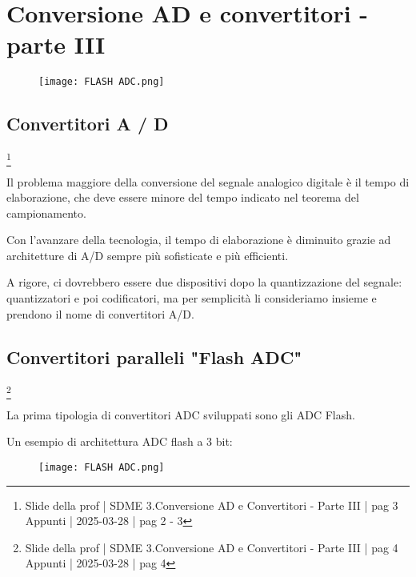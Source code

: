 \chapter{Conversione AD e convertitori - parte III}

\begin{figure}[h]
    \centering
    \texttt{[image: FLASH ADC.png]}
\end{figure}

\newpage 

\section{Convertitori A / D}
\footnote{Slide della prof | SDME 3.Conversione AD e Convertitori - Parte III | pag 3 \\  
Appunti | 2025-03-28 | pag 2 - 3}

Il problema maggiore della conversione del segnale analogico digitale è il tempo di elaborazione, 
che deve essere minore del tempo indicato nel teorema del campionamento. \newline 

Con l'avanzare della tecnologia, il tempo di elaborazione è diminuito grazie ad architetture di A/D sempre più sofisticate e più efficienti. \newline 

A rigore, ci dovrebbero essere due dispositivi dopo la quantizzazione del segnale: quantizzatori e poi codificatori, 
ma per semplicità li consideriamo insieme e prendono il nome di convertitori A/D. \newline

\newpage 

\section{Convertitori paralleli "Flash ADC"}
\footnote{Slide della prof | SDME 3.Conversione AD e Convertitori - Parte III | pag 4 \\  
Appunti | 2025-03-28 | pag 4}

La prima tipologia di convertitori ADC sviluppati sono gli ADC Flash. \newline 

Un esempio di architettura ADC flash a 3 bit: 

\begin{figure}[h]
    \centering
    \texttt{[image: FLASH ADC.png]}
\end{figure}

